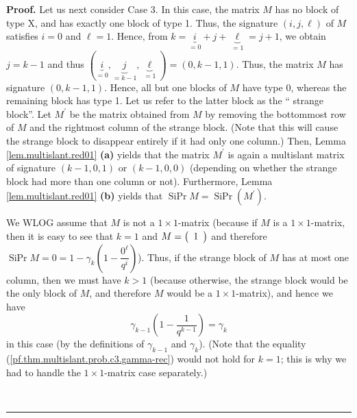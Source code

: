 \documentclass[numbers=enddot,12pt,final,onecolumn,notitlepage]{scrartcl}%
\theoremstyle{definition}
\newenvironment{proof}[1][Proof]{\noindent\textbf{#1.} }{\ \rule{0.5em}{0.5em}}
\theoremstyle{plainsl}
\begin{document}
\begin{proof}
Let us next consider Case 3. In this case, the matrix $M$ has no block of type
X, and has exactly one block of type 1. Thus, the signature $\left(
i,j,\ell\right)  $ of $M$ satisfies $i=0$ and $\ell=1$. Hence, from
$k=\underbrace{i}_{=0}+j+\underbrace{\ell}_{=1}=j+1$, we obtain $j=k-1$ and
thus $\left(  \underbrace{i}_{=0},\underbrace{j}_{=k-1},\underbrace{\ell}%
_{=1}\right)  =\left(  0,k-1,1\right)  $. Thus, the matrix $M$ has signature
$\left(  0,k-1,1\right)  $. Hence, all but one blocks of $M$ have type 0,
whereas the remaining block has type 1. Let us refer to the latter block as
the `` strange block''. Let $M^{\prime}$ be the
matrix obtained from $M$ by removing the bottommost row of $M$ and the
rightmost column of the strange block. (Note that this will cause the strange
block to disappear entirely if it had only one column.) Then, Lemma
\ref{lem.multislant.red01} \textbf{(a)} yields that the matrix $M^{\prime}$ is
again a multislant matrix of signature $\left(  k-1,0,1\right)  $ or $\left(
k-1,0,0\right)  $ (depending on whether the strange block had more than one
column or not). Furthermore, Lemma \ref{lem.multislant.red01} \textbf{(b)}
yields that $\operatorname*{SiPr}M=\operatorname*{SiPr}\left(  M^{\prime
}\right)  $.

We WLOG assume that $M$ is not a $1\times1$-matrix (because if $M$ is a
$1\times1$-matrix, then it is easy to see that $k=1$ and $M=\left(
\begin{array}
[c]{c}%
1
\end{array}
\right)  $ and therefore $\operatorname*{SiPr}M=0=1-\gamma_{k}\left(
1-\dfrac{0^{\ell}}{q^{i}}\right)  $). Thus, if the strange block of $M$ has at
most one column, then we must have $k>1$ (because otherwise, the strange block
would be the only block of $M$, and therefore $M$ would be a $1\times
1$-matrix), and hence we have
\begin{equation}
\gamma_{k-1}\left(  1-\dfrac{1}{q^{k-1}}\right)  =\gamma_{k}
\label{pf.thm.multislant.prob.c3.gamma-rec}%
\end{equation}
in this case (by the definitions of $\gamma_{k-1}$ and $\gamma_{k}$). (Note
that the equality (\ref{pf.thm.multislant.prob.c3.gamma-rec}) would not hold
for $k=1$; this is why we had to handle the $1\times1$-matrix case separately.)


\end{proof}
\end{document}
